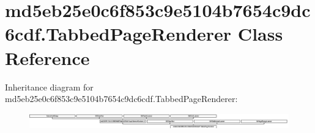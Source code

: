 \hypertarget{classmd5eb25e0c6f853c9e5104b7654c9dc6cdf_1_1TabbedPageRenderer}{}\section{md5eb25e0c6f853c9e5104b7654c9dc6cdf.\+Tabbed\+Page\+Renderer Class Reference}
\label{classmd5eb25e0c6f853c9e5104b7654c9dc6cdf_1_1TabbedPageRenderer}
Inheritance diagram for md5eb25e0c6f853c9e5104b7654c9dc6cdf.\+Tabbed\+Page\+Renderer\+:\begin{figure}[H]
\begin{center}
\leavevmode
\includegraphics[height=0.686275cm]{classmd5eb25e0c6f853c9e5104b7654c9dc6cdf_1_1TabbedPageRenderer}
\end{center}
\end{figure}
